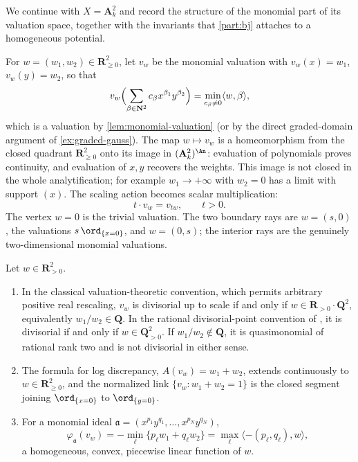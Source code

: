 We continue with $X=\mathbf A^2_k$ and record the structure of the monomial
part of its valuation space, together with the invariants that
\cref{part:bj} attaches to a homogeneous potential.

For $w=(w_1,w_2)\in\mathbf R^2_{\geq0}$, let $v_w$ be the monomial valuation
with $v_w(x)=w_1$, $v_w(y)=w_2$, so that
\begin{equation}
\label{eq:ch08-monomial-value}
 v_w\Bigl(\sum_{\beta\in\mathbf N^2}c_\beta x^{\beta_1}y^{\beta_2}\Bigr)
 =\min_{c_\beta\neq0}\langle w,\beta\rangle ,
\end{equation}
which is a valuation by \cref{lem:monomial-valuation} (or by the direct
graded-domain argument of \cref{ex:graded-gauss}).  The map $w\mapsto v_w$
is a homeomorphism from the closed quadrant $\mathbf R^2_{\geq0}$ onto its
image in $(\mathbf A^2_k)^{\An}$: evaluation of polynomials proves
continuity, and evaluation of $x,y$ recovers the weights.  This image is
not closed in the whole analytification; for example $w_1\to+\infty$ with
$w_2=0$ has a limit with support $(x)$.  The scaling action becomes scalar
multiplication:
\[
 t\cdot v_w=v_{tw},\qquad t>0 .
\]
The vertex $w=0$ is the trivial valuation.  The two boundary rays are
$w=(s,0)$, the valuations $s\,\ord_{\{x=0\}}$, and $w=(0,s)$; the interior
rays are the genuinely two-dimensional monomial valuations.

\begin{proposition}
\label{prop:ch08-monomial-invariants}
Let $w\in\mathbf R^2_{>0}$.
\begin{enumerate}
\item In the classical valuation-theoretic convention, which permits
arbitrary positive real rescaling, $v_w$ is divisorial up to scale if and
only if $w\in\mathbf R_{>0}\cdot\mathbf Q^2$, equivalently
$w_1/w_2\in\mathbf Q$.  In the rational divisorial-point convention of
, it is divisorial if and only if
$w\in\mathbf Q_{>0}^2$.  If $w_1/w_2\notin\mathbf Q$, it is quasimonomial
of rational rank two and is not divisorial in either sense.
\item The formula for log discrepancy,
$A(v_w)=w_1+w_2$, extends continuously to
$w\in\mathbf R^2_{\geq0}$, and the normalized link
$\{v_w:w_1+w_2=1\}$ is the closed segment joining
$\ord_{\{x=0\}}$ to $\ord_{\{y=0\}}$.
\item For a monomial ideal $\mathfrak a=(x^{p_1}y^{q_1},\ldots,
x^{p_N}y^{q_N})$,
\[
 \varphi_{\mathfrak a}(v_w)=-\min_{\ell}\{p_\ell w_1+q_\ell w_2\}
   =\max_{\ell}\langle-(p_\ell,q_\ell),w\rangle ,
\]
a homogeneous, convex, piecewise linear function of $w$.
\end{enumerate}
\end{proposition}

